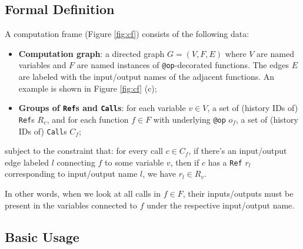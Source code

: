 \documentclass{article} %
\begin{document}
\subsection{Formal Definition}
\label{subsection:cf-definition}


A computation frame (Figure \ref{fig:cf}) consists of the following data:
\begin{itemize}
\item \textbf{Computation graph}: a directed graph $G=(V,F,E)$ where $V$ are
named variables and $F$ are named instances of \texttt{@op}-decorated functions.
The edges $E$ are labeled with the input/output names of the adjacent functions.
An example is shown in Figure \ref{fig:cf} (c);
\item \textbf{Groups of \texttt{Ref}s and \texttt{Call}s}: for each variable
$v\in V$, a set of (history IDs of) \texttt{Ref}s $R_v$, and for each function
$f\in F$ with underlying \texttt{@op} $o_f$, a set of (history IDs of) \texttt{Call}s $C_f$; 
\end{itemize}
subject to the constraint that: for every call $c\in C_f$, if there's an
input/output edge labeled $l$ connecting $f$ to some variable $v$, then if $c$
has a \texttt{Ref} $r_l$ corresponding to input/output name $l$, we have $r_l\in
R_v$. 

In other words, when we look at all calls in $f\in F$, their inputs/outputs must
be present in the variables connected to $f$ under the respective input/output
name. 

\subsection{Basic Usage}
\label{subsection:cf-basic-usage}
\end{document}
